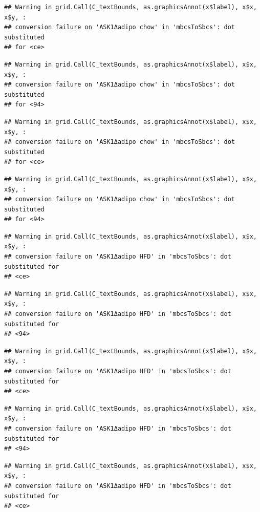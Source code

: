 \documentclass[]{book}
\begin{document}
\begin{verbatim}
## Warning in grid.Call(C_textBounds, as.graphicsAnnot(x$label), x$x, x$y, :
## conversion failure on 'ASK1Δadipo chow' in 'mbcsToSbcs': dot substituted
## for <ce>
\end{verbatim}

\begin{verbatim}
## Warning in grid.Call(C_textBounds, as.graphicsAnnot(x$label), x$x, x$y, :
## conversion failure on 'ASK1Δadipo chow' in 'mbcsToSbcs': dot substituted
## for <94>
\end{verbatim}

\begin{verbatim}
## Warning in grid.Call(C_textBounds, as.graphicsAnnot(x$label), x$x, x$y, :
## conversion failure on 'ASK1Δadipo chow' in 'mbcsToSbcs': dot substituted
## for <ce>
\end{verbatim}

\begin{verbatim}
## Warning in grid.Call(C_textBounds, as.graphicsAnnot(x$label), x$x, x$y, :
## conversion failure on 'ASK1Δadipo chow' in 'mbcsToSbcs': dot substituted
## for <94>
\end{verbatim}

\begin{verbatim}
## Warning in grid.Call(C_textBounds, as.graphicsAnnot(x$label), x$x, x$y, :
## conversion failure on 'ASK1Δadipo HFD' in 'mbcsToSbcs': dot substituted for
## <ce>
\end{verbatim}

\begin{verbatim}
## Warning in grid.Call(C_textBounds, as.graphicsAnnot(x$label), x$x, x$y, :
## conversion failure on 'ASK1Δadipo HFD' in 'mbcsToSbcs': dot substituted for
## <94>
\end{verbatim}

\begin{verbatim}
## Warning in grid.Call(C_textBounds, as.graphicsAnnot(x$label), x$x, x$y, :
## conversion failure on 'ASK1Δadipo HFD' in 'mbcsToSbcs': dot substituted for
## <ce>
\end{verbatim}

\begin{verbatim}
## Warning in grid.Call(C_textBounds, as.graphicsAnnot(x$label), x$x, x$y, :
## conversion failure on 'ASK1Δadipo HFD' in 'mbcsToSbcs': dot substituted for
## <94>
\end{verbatim}

\begin{verbatim}
## Warning in grid.Call(C_textBounds, as.graphicsAnnot(x$label), x$x, x$y, :
## conversion failure on 'ASK1Δadipo HFD' in 'mbcsToSbcs': dot substituted for
## <ce>
\end{verbatim}
\end{document}
